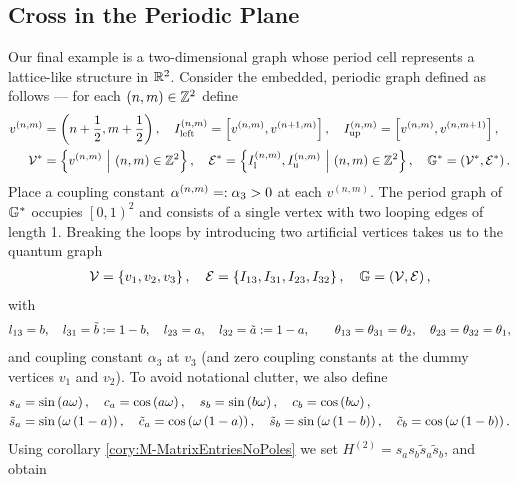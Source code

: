 \subsection{Cross in the Periodic Plane} \label{ssec:ExampleCrossInPlane}
Our final example is a two-dimensional graph whose period cell represents a lattice-like structure in $\mathbb{R}^2$.
Consider the embedded, periodic graph defined as follows --- for each $\left( n,m \right)\in\mathbb{Z}^2$ define
\begin{align*}
	v^{(n,m)} &= \left( n+\frac{1}{2}, m+\frac{1}{2} \right), \quad
	I_{\mathrm{left}}^{\left( n,m \right)} = \left[ v^{\left( n,m \right)}, v^{\left( n+1,m \right)} \right], \quad
	I_{\mathrm{up}}^{\left( n,m \right)} = \left[ v^{\left( n,m \right)}, v^{\left( n,m+1 \right)} \right], \\
	\mathcal{V}^* &= \left\{ v^{\left( n,m \right)} \ \middle\vert \  \left( n,m \right)\in\mathbb{Z}^2 \right\}, \quad
	\mathcal{E}^* = \left\{  I_{\mathrm{l}}^{\left( n,m \right)}, I_{\mathrm{u}}^{\left( n,m \right)} \ \middle\vert \  \left( n,m \right)\in\mathbb{Z}^2 \right\}, \quad
	\mathbb{G}^* = \left( \mathcal{V}^*, \mathcal{E}^* \right).
\end{align*}
Place a coupling constant $\alpha^{\left( n,m \right)} =: \alpha_3>0$ at each $v^{(n,m)}$.
The period graph of $\mathbb{G}^*$ occupies $\left[0,1\right)^2$ and consists of a single vertex with two looping edges of length 1.
Breaking the loops by introducing two artificial vertices takes us to the quantum graph
\begin{align*}
	\mathcal{V} = \left\{ v_1, v_2, v_3 \right\}, \quad
	\mathcal{E} = \left\{ I_{13}, I_{31}, I_{23}, I_{32} \right\}, \quad
	\mathbb{G} = \left( \mathcal{V}, \mathcal{E} \right),
\end{align*}
with
\begin{align*}
	l_{13} = b, \quad l_{31} = \tilde{b} := 1-b, \quad 
	l_{23} = a, \quad l_{32} = \tilde{a} := 1-a, \qquad
	\theta_{13} = \theta_{31} = \theta_2, \quad \theta_{23} = \theta_{32} = \theta_1,
\end{align*}
and coupling constant $\alpha_3$ at $v_3$ (and zero coupling constants at the dummy vertices $v_1$ and $v_2$).
To avoid notational clutter, we also define
\begin{align*}
	s_a &= \sin\left( a\omega \right), \quad 
	c_a = \cos\left( a\omega \right), \quad 
	s_b = \sin\left( b\omega \right), \quad 
	c_b = \cos\left( b\omega \right), \\
	\tilde{s}_a &= \sin\left( \omega\left( 1-a \right) \right), \quad 
	\tilde{c}_a = \cos\left( \omega\left( 1-a \right) \right), \quad 
	\tilde{s}_b = \sin\left( \omega\left( 1-b \right) \right), \quad 
	\tilde{c}_b = \cos\left( \omega\left( 1-b \right) \right).
\end{align*}
Using corollary \ref{cory:M-MatrixEntriesNoPoles} we set $H^{(2)} = s_a s_b \tilde{s}_a \tilde{s}_b$, and obtain
